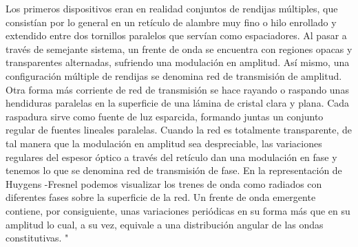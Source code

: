 \documentclass[12]{article}
\begin{document}
\begin{multicols}{2}
Los primeros dispositivos eran en realidad conjuntos de rendijas múltiples, que consistían por lo general en un retículo de alambre muy fino o hilo enrollado y extendido entre dos tornillos paralelos que servían como espaciadores. Al pasar a través de semejante sistema, un frente de onda se encuentra con regiones opacas y transparentes alternadas, sufriendo una modulación en amplitud. Así mismo, una configuración múltiple de rendijas se denomina red de transmisión de amplitud. Otra forma más corriente de red de transmisión se hace rayando o raspando  unas hendiduras paralelas en la superficie de una lámina de cristal clara y plana. Cada raspadura sirve como fuente de luz esparcida, formando juntas un conjunto regular de fuentes lineales paralelas. Cuando la red es totalmente transparente, de tal manera que la modulación en amplitud sea despreciable, las variaciones regulares del espesor óptico a través del retículo dan una modulación en fase y tenemos lo que se denomina red de transmisión de fase. En la representación de Huygens -Fresnel podemos visualizar los trenes de onda como radiados con diferentes fases sobre la superficie de la red. Un frente de onda emergente contiene, por consiguiente, unas variaciones periódicas en su forma más que en su amplitud lo cual, a su vez, equivale a una distribución angular de las ondas constitutivas. "\cite{OPTICA}

\end{multicols}
\end{document}
